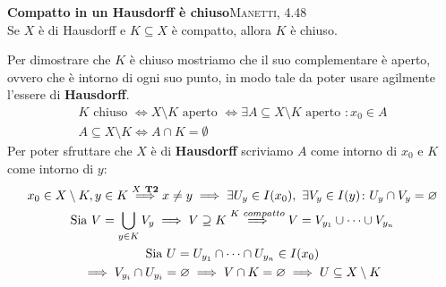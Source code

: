 \begin{theorema}\textbf{Compatto in un Hausdorff è chiuso}\textsc{Manetti, 4.48} \label{compatto in hausdorff chiuso} \\ 
Se $X$ è di Hausdorff e $K\subseteq X$ è compatto, allora $K$ è chiuso.
\end{theorema}
\begin{demonstration}
	Per dimostrare che $K$ è chiuso mostriamo che il suo complementare è aperto, ovvero che è intorno di ogni suo punto, in modo tale da poter usare agilmente l'essere di \textbf{Hausdorff}.
		\begin{gather*}
			K \text{ chiuso } \iff X\setminus K \text{ aperto } \iff \exists A\subseteq X\setminus K \text{ aperto } \colon x_0\in A \\
			A\subseteq X\setminus K \iff A\cap K=\emptyset
		\end{gather*}
	Per poter sfruttare che $X$ è di \textbf{Hausdorff} scriviamo $A$ come intorno di $x_0$ e $K$ come intorno di $y$:
		\begin{gather*}
			x_0\in X\setminus K, y\in K \stackrel{X\ \textbf{T2}}{\implies} x\neq y\implies \exists U_y\in I(x_0), \ \exists V_y\in I(y) \colon U_y\cap V_y=\emptyset \\
			\text{Sia } V=\union_{y\in K}V_y \implies V\supseteq K \stackrel{K\ compatto}{\Longrightarrow} V=V_{y_1}\cup\dots\cup V_{y_n} \\
			\text{Sia } U=U_{y_1}\cap\dots\cap U_{y_n} \in I(x_0)\\
			\implies V_{y_i}\cap U_{y_i}=\emptyset \implies V\cap K=\emptyset \implies U\subseteq X\setminus K
		\end{gather*}
\end{demonstration}

